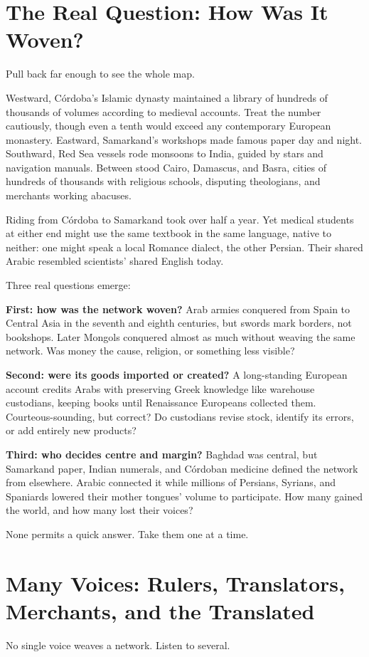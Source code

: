 \section{The Real Question: How Was It Woven?}
Pull back far enough to see the whole map.

Westward, Córdoba's Islamic dynasty maintained a library of hundreds of thousands of volumes according to medieval accounts. Treat the number cautiously, though even a tenth would exceed any contemporary European monastery. Eastward, Samarkand's workshops made famous paper day and night. Southward, Red Sea vessels rode monsoons to India, guided by stars and navigation manuals. Between stood Cairo, Damascus, and Basra, cities of hundreds of thousands with religious schools, disputing theologians, and merchants working abacuses.

Riding from Córdoba to Samarkand took over half a year. Yet medical students at either end might use the same textbook in the same language, native to neither: one might speak a local Romance dialect, the other Persian. Their shared Arabic resembled scientists' shared English today.

Three real questions emerge:

\textbf{First: how was the network woven?} Arab armies conquered from Spain to Central Asia in the seventh and eighth centuries, but swords mark borders, not bookshops. Later Mongols conquered almost as much without weaving the same network. Was money the cause, religion, or something less visible?

\textbf{Second: were its goods imported or created?} A long-standing European account credits Arabs with preserving Greek knowledge like warehouse custodians, keeping books until Renaissance Europeans collected them. Courteous-sounding, but correct? Do custodians revise stock, identify its errors, or add entirely new products?

\textbf{Third: who decides centre and margin?} Baghdad was central, but Samarkand paper, Indian numerals, and Córdoban medicine defined the network from elsewhere. Arabic connected it while millions of Persians, Syrians, and Spaniards lowered their mother tongues' volume to participate. How many gained the world, and how many lost their voices?

None permits a quick answer. Take them one at a time.

\section[Rulers, Translators, and Traders]{Many Voices: Rulers, Translators, Merchants, and the Translated}
No single voice weaves a network. Listen to several.

